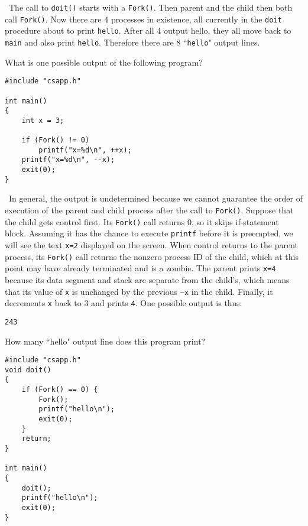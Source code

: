 \documentclass[12pt]{article}
\newenvironment{ex}[2][Exercise]{\begin{trivlist}
		\item[\hskip \labelsep {\bfseries #1}\hskip \labelsep {\bfseries #2.}]}{\end{trivlist}}
\newenvironment{sol}[1][Solution]{\begin{trivlist}
		\item[\hskip \labelsep {\bfseries #1:}]}{\end{trivlist}}
\begin{document}
\begin{sol}
	\
	The call to \texttt{doit()} starts with a \texttt{Fork()}. Then parent and the child then both
	call \texttt{Fork()}. Now there are 4 processes in existence, all currently in the \texttt{doit}
	procedure about to print \texttt{hello}. After all 4 output hello, they all move back to
	\texttt{main} and also print \texttt{hello}. Therefore there are 8 ``\texttt{hello}" output
	lines.
\end{sol}

\begin{ex}{8.13}
	What is one possible output of the following program?
	\begin{lstlisting}
#include "csapp.h"

int main()
{
	int x = 3;
	
	if (Fork() != 0)
		printf("x=%d\n", ++x);
	printf("x=%d\n", --x);
	exit(0);
}
	\end{lstlisting}
\end{ex}

\begin{sol}
	\
	In general, the output is undetermined because we cannot guarantee the order of execution of
	the parent and child process after the call to \texttt{Fork()}. Suppose that the child
	gets control first. Its \texttt{Fork()} call returns 0, so it skips if-statement block.
	Assuming it has the chance to execute \texttt{printf} before it is preempted, we will see
	the text \texttt{x=2} displayed on the screen. When control returns to the parent process,
	its \texttt{Fork()} call returns the nonzero process ID of the child, which at this point
	may have already terminated and is a zombie. The parent prints \texttt{x=4} because its
	data segment and stack are separate from the child's, which means that its value of \texttt{x}
	is unchanged by the previous \texttt{--x} in the child. Finally, it decrements \texttt{x} back
	to 3 and prints \texttt{4}. One possible output is thus:
	\begin{lstlisting}[language={}]
243
	\end{lstlisting}
\end{sol}

\begin{ex}{8.14}
	How many ``hello" output line does this program print?
	\begin{lstlisting}
#include "csapp.h"
void doit()
{
	if (Fork() == 0) {
		Fork();
		printf("hello\n");
		exit(0);
	}
	return;
}

int main()
{
	doit();
	printf("hello\n");
	exit(0);
}
	\end{lstlisting}
\end{ex}
\end{document}
